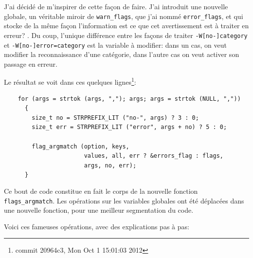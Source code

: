 \documentclass[a4paper,11pt,twoside,final]{article}
\begin{document}
  J'ai décidé de m'inspirer de cette façon de faire. J'ai introduit une
  nouvelle globale, un véritable miroir de \texttt{warn\_flags}, que j'ai nommé
  \texttt{error\_flags}, et qui stocke de la même façon l'information \og est
  ce que cet avertissement est à traiter en erreur? \fg. Du coup, l'unique
  différence entre les façons de traiter \texttt{-W[no-]category} et
  \texttt{-W[no-]error=category} est la variable à modifier: dans un cas, on
  veut modifier la reconnaissance d'une catégorie, dans l'autre cas on veut
  activer son passage en erreur.

  Le résultat se voit dans ces quelques lignes\footnote{%
  commit 20964c3, Mon Oct 1 15:01:03 2012}:

  \begin{verbatim}
    for (args = strtok (args, ","); args; args = strtok (NULL, ","))
      {
        size_t no = STRPREFIX_LIT ("no-", args) ? 3 : 0;
        size_t err = STRPREFIX_LIT ("error", args + no) ? 5 : 0;

        flag_argmatch (option, keys,
                       values, all, err ? &errors_flag : flags,
                       args, no, err);
      }
  \end{verbatim}

  Ce bout de code constitue en fait le corps de la nouvelle fonction
  \texttt{flags\_argmatch}. Les opérations sur les variables globales ont été
  déplacées dans une nouvelle fonction, pour une meilleur segmentation du code.

  Voici ces fameuses opérations, avec des explications pas à pas:
\end{document}
